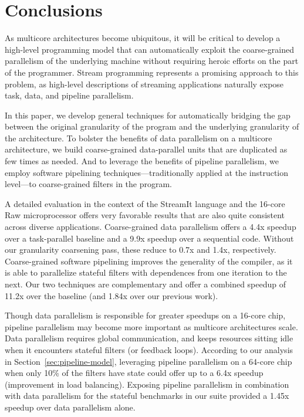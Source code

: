 \section{Conclusions}

As multicore architectures become ubiquitous, it will be critical to
develop a high-level programming model that can automatically exploit
the coarse-grained parallelism of the underlying machine without
requiring heroic efforts on the part of the programmer.  Stream
programming represents a promising approach to this problem, as
high-level descriptions of streaming applications naturally expose
task, data, and pipeline parallelism.  

In this paper, we develop general techniques for automatically
bridging the gap between the original granularity of the program and
the underlying granularity of the architecture.  To bolster the
benefits of data parallelism on a multicore architecture, we build
coarse-grained data-parallel units that are duplicated as few times as
needed.  And to leverage the benefits of pipeline parallelism, we
employ software pipelining techniques---traditionally applied at the
instruction level---to coarse-grained filters in the program.

A detailed evaluation in the context of the StreamIt language and the
16-core Raw microprocessor offers very favorable results that are also
quite consistent across diverse applications.  Coarse-grained data
parallelism offers a 4.4x speedup over a task-parallel baseline and a
9.9x speedup over a sequential code.  Without our granularity
coarsening pass, these reduce to 0.7x and 1.4x, respectively.
Coarse-grained software pipelining improves the generality of the
compiler, as it is able to parallelize stateful filters with
dependences from one iteration to the next.  Our two techniques are
complementary and offer a combined speedup of 11.2x over the baseline
(and 1.84x over our previous work).

Though data parallelism is responsible for greater speedups on a
16-core chip, pipeline parallelism may become more important as
multicore architectures scale.  Data parallelism requires global
communication, and keeps resources sitting idle when it encounters
stateful filters (or feedback loops).  According to our analysis in
Section~\ref{sec:pipeline-model}, leveraging pipeline parallelism on a
64-core chip when only 10\% of the filters have state could offer up
to a 6.4x speedup (improvement in load balancing).  Exposing pipeline
parallelism in combination with data parallelism for the stateful
benchmarks in our suite provided a 1.45x speedup over data parallelism
alone.

